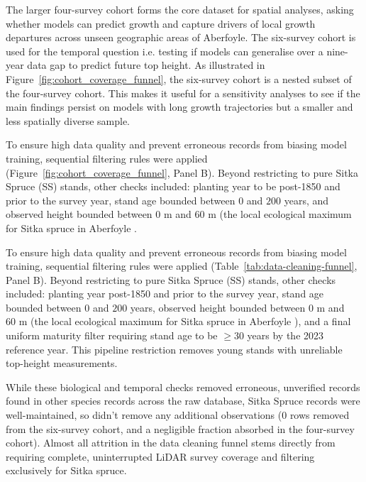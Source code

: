 \documentclass[logo,msc,ai]{infthesis}           %
\begin{document}
The larger four-survey cohort forms the core dataset for spatial analyses, asking whether models can predict growth and capture drivers of local growth departures across unseen geographic areas of Aberfoyle. The six-survey cohort is used for the temporal question i.e. testing if models can generalise over a nine-year data gap to predict future top height. As illustrated in Figure~\ref{fig:cohort_coverage_funnel}, the six-survey cohort is a nested subset of the four-survey cohort. This makes it useful for a sensitivity analyses to see if the main findings persist on models with long growth trajectories but a smaller and less spatially diverse sample. 

To ensure high data quality and prevent erroneous records from biasing model training, sequential filtering rules were applied (Figure~\ref{fig:cohort_coverage_funnel}, Panel B). Beyond restricting to pure Sitka Spruce (SS) stands, other checks included: planting year to be post-1850 and prior to the survey year, stand age bounded between $0$ and $200$ years, and observed height bounded between $0\text{~m}$ and $60\text{~m}$ (the local ecological maximum for Sitka spruce in Aberfoyle \cite{mason2011Sitka_C1_SS}. 

To ensure high data quality and prevent erroneous records from biasing model training, sequential filtering rules were applied (Table~\ref{tab:data-cleaning-funnel}, Panel B). Beyond restricting to pure Sitka Spruce (SS) stands, other checks included: planting year post-1850 and prior to the survey year, stand age bounded between $0$ and $200$ years, observed height bounded between $0\text{~m}$ and $60\text{~m}$ (the local ecological maximum for Sitka spruce in Aberfoyle \cite{mason2011Sitka_C1_SS}), and a final uniform maturity filter requiring stand age to be $\ge 30$ years by the 2023 reference year\cite{suarezminguez2008Practical_C1_SS}. This pipeline restriction removes young stands with unreliable top-height measurements.

While these biological and temporal checks removed erroneous, unverified records found in other species records across the raw database, Sitka Spruce records were well-maintained, so didn't remove any additional observations ($0$ rows removed from the six-survey cohort, and a negligible fraction absorbed in the four-survey cohort). Almost all attrition in the data cleaning funnel stems directly from requiring complete, uninterrupted LiDAR survey coverage and filtering exclusively for Sitka spruce.
\end{document}
